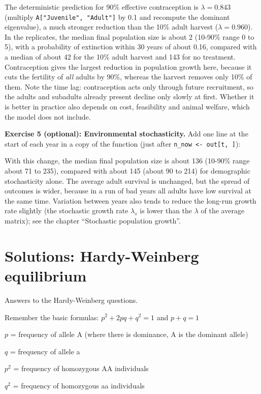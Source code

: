 \documentclass[
  a4paper]{book}
\begin{document}
The deterministic prediction for 90\% effective contraception is \(\lambda = 0.843\) (multiply \texttt{A{[}"Juvenile",\ "Adult"{]}} by 0.1 and recompute the dominant eigenvalue), a much stronger reduction than the 10\% adult harvest (\(\lambda = 0.960\)). In the replicates, the median final population size is about 2 (10-90\% range 0 to 5), with a probability of extinction within 30 years of about 0.16, compared with a median of about 42 for the 10\% adult harvest and 143 for no treatment. Contraception gives the largest reduction in population growth here, because it cuts the fertility of \emph{all} adults by 90\%, whereas the harvest removes only 10\% of them. Note the time lag: contraception acts only through future recruitment, so the adults and subadults already present decline only slowly at first. Whether it is better in practice also depends on cost, feasibility and animal welfare, which the model does not include.

\textbf{Exercise 5 (optional): Environmental stochasticity.} Add one line at the start of each year in a copy of the function (just after \texttt{n\_now\ \textless{}-\ out{[}t,\ {]}}):

With this change, the median final population size is about 136 (10-90\% range about 71 to 235), compared with about 145 (about 90 to 214) for demographic stochasticity alone. The average adult survival is unchanged, but the spread of outcomes is wider, because in a run of bad years all adults have low survival at the same time. Variation between years also tends to reduce the long-run growth rate slightly (the stochastic growth rate \(\lambda_s\) is lower than the \(\lambda\) of the average matrix); see the chapter ``Stochastic population growth''.

\section{Solutions: Hardy-Weinberg equilibrium}\label{solutions-hardy-weinberg-equilibrium}

Answers to the Hardy-Weinberg questions.

Remember the basic formulas:
\(p^2 + 2pq + q^2 = 1\) and \(p + q = 1\)

\(p\) = frequency of allele A (where there is dominance, A is the dominant allele)

\(q\) = frequency of allele a

\(p^2\) = frequency of homozygous AA individuals

\(q^2\) = frequency of homozygous aa individuals
\end{document}
